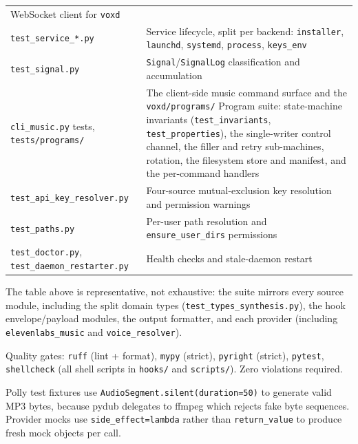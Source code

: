 \documentclass[a4paper,10pt]{article}
\begin{document}
\begin{center}
\begin{tabular}{lp{7cm}}
  WebSocket client for \texttt{voxd} \\
\texttt{test\_service\_*.py}        & Service lifecycle, split per backend:
  \texttt{installer}, \texttt{launchd}, \texttt{systemd}, \texttt{process},
  \texttt{keys\_env} \\
\texttt{test\_signal.py}            & \texttt{Signal}/\texttt{SignalLog}
  classification and accumulation \\
\texttt{cli\_music.py} tests, \texttt{tests/programs/} & The client-side
  music command surface and the \texttt{voxd/programs/} Program suite:
  state-machine invariants (\texttt{test\_invariants},
  \texttt{test\_properties}), the single-writer control channel, the
  filler and retry sub-machines, rotation, the filesystem store and
  manifest, and the per-command handlers \\
\texttt{test\_api\_key\_resolver.py} & Four-source mutual-exclusion key
  resolution and permission warnings \\
\texttt{test\_paths.py}             & Per-user path resolution and
  \texttt{ensure\_user\_dirs} permissions \\
\texttt{test\_doctor.py}, \texttt{test\_daemon\_restarter.py} & Health
  checks and stale-daemon restart \\
\bottomrule
\end{tabular}
\end{center}

The table above is representative, not exhaustive: the suite mirrors
every source module, including the split domain types
(\texttt{test\_types\_synthesis.py}), the hook envelope/payload modules,
the output formatter, and each provider (including
\texttt{elevenlabs\_music} and \texttt{voice\_resolver}).

Quality gates: \texttt{ruff} (lint + format), \texttt{mypy} (strict),
\texttt{pyright} (strict), \texttt{pytest}, \texttt{shellcheck}
(all shell scripts in \texttt{hooks/} and \texttt{scripts/}).
Zero violations required.

Polly test fixtures use \texttt{AudioSegment.silent(duration=50)}
to generate valid MP3 bytes, because pydub delegates to ffmpeg
which rejects fake byte sequences.  Provider mocks use
\texttt{side\_effect=lambda} rather than \texttt{return\_value} to
produce fresh mock objects per call.
\end{document}
